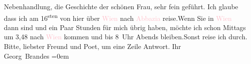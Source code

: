                     Nebenhandlung, die Geschichte der schönen Frau, sehr fein geführt.\pend
           \pstart
           Ich glaube dass ich am 16\textsuperscript{sten} von hier über \textcolor{pink}{Wien}{}\ledrightnote{\textcolor{pink}{Wien}} nach \textcolor{pink}{Abbazia}{}\ledrightnote{\textcolor{pink}{Opatija}} reise.\hspace*{1.5em}Wenn Sie in \textcolor{pink}{Wien}{}\ledrightnote{\textcolor{pink}{Wien}} dann sind
                    und ein Paar Stunden für mich übrig haben, möchte ich schon Mittags um
                        3,48 nach \textcolor{pink}{Wien}{}\ledrightnote{\textcolor{pink}{Wien}} kommen und bis
                        8 Uhr Abends bleiben.\hspace*{1.5em}Sonst
                    reise ich durch.\pend
           \pstart
           Bitte, liebster Freund und Poet, um eine Zeile Antwort.\pend
           \pstart
           Ihr{\\[\baselineskip]}\spacefill\mbox{Georg Brandes}\pend
           \leftskip=0em{}\endnumbering{}  
      